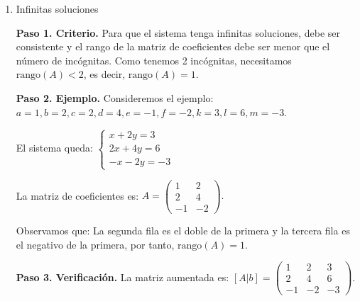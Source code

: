 \begin{prob}
\begin{enumerate}[$a)$]
\begin{myproof}
Como tenemos 2 incógnitas $(x, y)$, necesitamos $\text{rango}(A) = 2$.

\textbf{Paso 2. Ejemplo.} Consideremos el ejemplo: $\boxed{a = 1, b = 0, c = 0, d = 1, e = 1, f = 1, k = 2, l = 3, m = 5}.$

El sistema queda: $\left\lbrace \begin{array}{c}
x = 2\\
y = 3\\
x + y = 5
\end{array} \right.$

La matriz de coeficientes es: $A = \begin{pmatrix}
1 & 0 \\
0 & 1 \\
1 & 1
\end{pmatrix}.$

\textbf{Paso 3. Verificación.} Claramente $\text{rango}(A) = 2$ (las dos primeras filas son linealmente independientes). Por tanto, $\text{rango}(A) = \text{rango}([A|b]) = 2 = $ número de incógnitas, lo que garantiza una única solución.
\end{myproof}

\item Infinitas soluciones 
\begin{myproof}
\textbf{Paso 1. Criterio.} Para que el sistema tenga infinitas soluciones, debe ser consistente y el rango de la matriz de coeficientes debe ser menor que el número de incógnitas. Como tenemos 2 incógnitas, necesitamos $\text{rango}(A) < 2$, es decir, $\text{rango}(A) = 1$.

\textbf{Paso 2. Ejemplo.} Consideremos el ejemplo: $\boxed{a = 1, b = 2, c = 2, d = 4, e = -1, f = -2, k = 3, l = 6, m = -3}.$

El sistema queda: $\left\lbrace \begin{array}{c}
x + 2y = 3\\
2x + 4y = 6\\
-x - 2y = -3
\end{array} \right.$

La matriz de coeficientes es: $A = \begin{pmatrix}
1 & 2 \\
2 & 4 \\
-1 & -2
\end{pmatrix}.$

Observamos que: La segunda fila es el doble de la primera y la tercera fila es el negativo de la primera, por tanto, $\text{rango}(A) = 1$.

\textbf{Paso 3. Verificación.} La matriz aumentada es: $[A|b] = \begin{pmatrix}
1 & 2 & 3 \\
2 & 4 & 6 \\
-1 & -2 & -3
\end{pmatrix}.$


\end{myproof}
\end{enumerate}
\end{prob}
